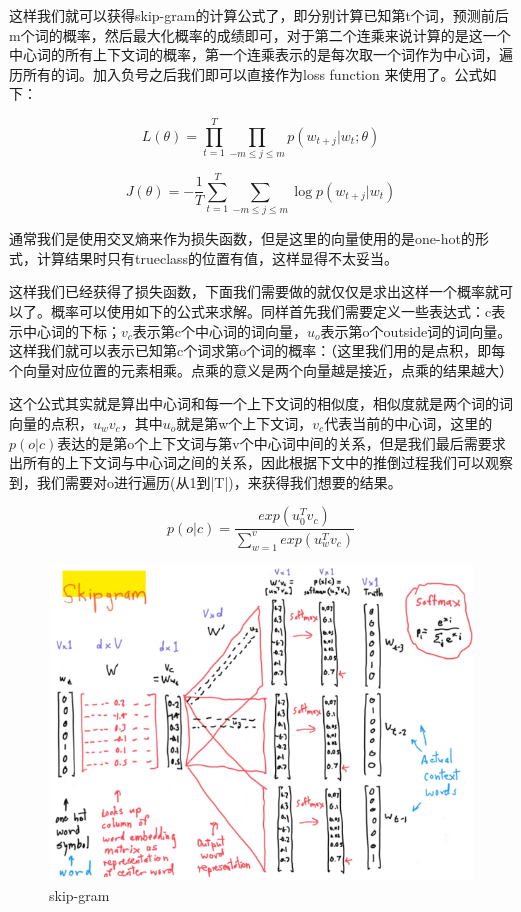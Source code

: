 	这样我们就可以获得skip-gram的计算公式了，即分别计算已知第t个词，预测前后m个词的概率，然后最大化概率的成绩即可，对于第二个连乘来说计算的是这一个中心词的所有上下文词的概率，第一个连乘表示的是每次取一个词作为中心词，遍历所有的词。加入负号之后我们即可以直接作为loss function 来使用了。公式如下：
	
	\begin{equation}
		L(\theta) = \prod_{t=1}^{T} \prod_{-m \leq j \leq m} p(w_{t+j}|w_t;\theta)
	\end{equation}
	
	\begin{equation}
		J(\theta) = -\frac{1}{T} \sum_{t=1}^{T} \sum_{-m \leq j \leq m} \log p(w_{t+j}|w_t)
	\end{equation}
	
	通常我们是使用交叉熵来作为损失函数，但是这里的向量使用的是one-hot的形式，计算结果时只有trueclass的位置有值，这样显得不太妥当。
	
	这样我们已经获得了损失函数，下面我们需要做的就仅仅是求出这样一个概率就可以了。概率可以使用如下的公式来求解。同样首先我们需要定义一些表达式：c表示中心词的下标；$v_c$表示第c个中心词的词向量，$u_o$表示第o个outside词的词向量。这样我们就可以表示已知第c个词求第o个词的概率：（这里我们用的是点积，即每个向量对应位置的元素相乘。点乘的意义是两个向量越是接近，点乘的结果越大）
	
	这个公式其实就是算出中心词和每一个上下文词的相似度，相似度就是两个词的词向量的点积，$u_wv_c$，其中$u_o$就是第w个上下文词，$v_c$代表当前的中心词，这里的$p(o|c)$表达的是第o个上下文词与第v个中心词中间的关系，但是我们最后需要求出所有的上下文词与中心词之间的关系，因此根据下文中的推倒过程我们可以观察到，我们需要对o进行遍历(从1到|T|)，来获得我们想要的结果。
	
	\begin{equation}
	p(o|c) = \frac{exp(u_0^T v_c)}{\sum_{w=1}^v exp(u_w^T v_c)}
	\end{equation}
	
	\begin{figure}[!htbp]
	\centering\includegraphics[width=5.5in]{img/6-4.png}
	\caption{skip-gram}\label{fig:6-4}
	\end{figure}
	
